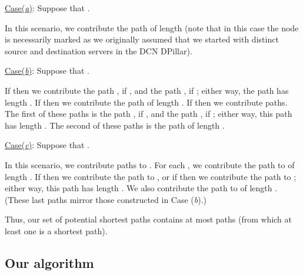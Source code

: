 \documentclass{article}
\begin{document}
\noindent\underline{Case(\emph{a\/})}: Suppose that .\smallskip

\noindent In this scenario, we contribute the path  of length  (note that in this case the node  is necessarily marked as we originally assumed that we started with distinct source and destination servers in the DCN DPillar).\smallskip

\noindent\underline{Case(\emph{b\/})}: Suppose that .\smallskip

\noindent If  then we contribute the path , if , and the path , if ; either way, the path has length . If  then we contribute the path  of length . If  then we contribute  paths. The first of these paths is the path , if , and the path , if ; either way, this path has length . The second of these paths is the path  of length .\smallskip

\noindent\underline{Case(\emph{c\/})}: Suppose that .\smallskip

\noindent In this scenario, we contribute  paths to . For each , we contribute the path  to  of length . If  then we contribute the path  to , or if  then we contribute the path  to ; either way, this path has length . We also contribute the path  to  of length . (These last  paths mirror those constructed in Case (\emph{b\/}).)\smallskip

Thus, our set  of potential shortest paths contains at most  paths (from which at least one is a shortest path).

\subsection{Our algorithm}
\end{document}
